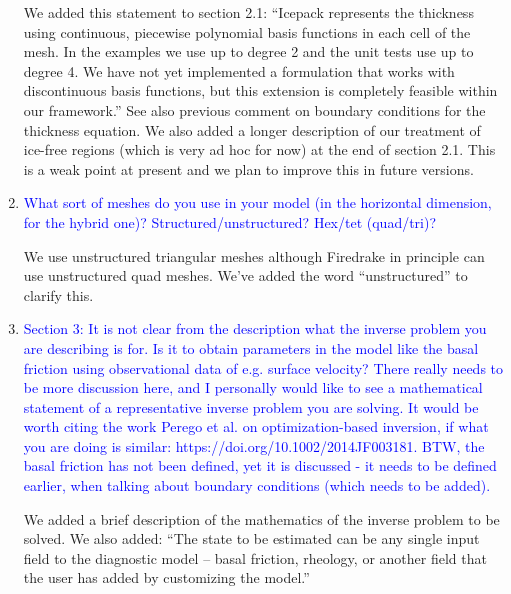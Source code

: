 \documentclass{article}
\theoremstyle{definition}
\theoremstyle{plain}
\begin{document}
\begin{enumerate}
We added this statement to section 2.1: ``Icepack represents the thickness using continuous, piecewise polynomial basis functions in each cell of the mesh.
In the examples we use up to degree 2 and the unit tests use up to degree 4.
We have not yet implemented a formulation that works with discontinuous basis functions, but this extension is completely feasible within our framework.''
See also previous comment on boundary conditions for the thickness equation.
We also added a longer description of our treatment of ice-free regions (which is very ad hoc for now) at the end of section 2.1.
This is a weak point at present and we plan to improve this in future versions.



\item \textcolor{blue}{What sort of meshes do you use in your model (in the horizontal dimension, for the hybrid one)?
Structured/unstructured? Hex/tet (quad/tri)?}

We use unstructured triangular meshes although Firedrake in principle can use unstructured quad meshes.
We've added the word ``unstructured'' to clarify this.

\item \textcolor{blue}{Section 3: It is not clear from the description what the inverse problem you are describing is for.
Is it to obtain parameters in the model like the basal friction using observational data of e.g. surface velocity? There really needs to be more discussion here, and I personally would like to see
a mathematical statement of a representative inverse problem you are solving. It would be worth
citing the work Perego et al. on optimization-based inversion, if what you are doing is similar:
https://doi.org/10.1002/2014JF003181. BTW, the basal friction has not been defined, yet it is
discussed - it needs to be defined earlier, when talking about boundary conditions (which needs to
be added).}

We added a brief description of the mathematics of the inverse problem to be solved.
We also added: ``The state to be estimated can be any single input field to the diagnostic model -- basal friction, rheology, or another field that the user has added by customizing the model.''


\end{enumerate}
\end{document}

